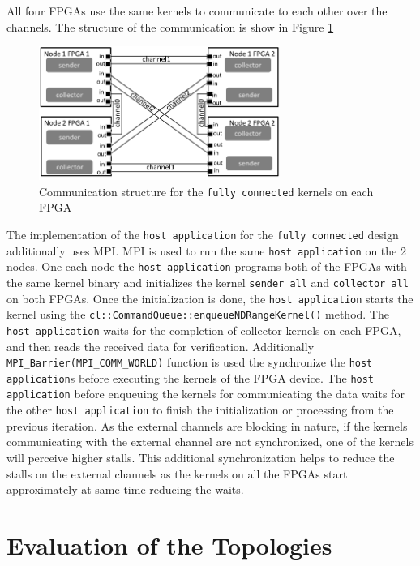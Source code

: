All four FPGAs use the same kernels to communicate to each other over the channels.
The structure of the communication is show in Figure \ref{fig:fc_struc}

\begin{figure}[h]%
    \centering
    \includegraphics[width=0.7\textwidth]{images/fc_struc}
    \caption{Communication structure for the \texttt{fully connected} kernels on each FPGA}
    \label{fig:fc_struc}
\end{figure}

The implementation of the \texttt{host application} for the \texttt{fully connected} design additionally
uses MPI. MPI is used to run the same \texttt{host application} on the 2 nodes. One each node
the \texttt{host application} programs both of the FPGAs with the same kernel binary and initializes
the kernel \texttt{sender\_all} and \texttt{collector\_all} on both FPGAs. Once the initialization
is done, the \texttt{host application} starts the kernel using the \texttt{cl::CommandQueue::enqueueNDRangeKernel()}
method. The \texttt{host application} waits for the completion of collector kernels on each FPGA, and then reads
the received data for verification. Additionally \texttt{MPI\_Barrier(MPI\_COMM\_WORLD)} function
is used the synchronize the \texttt{host application}s before executing the kernels of the FPGA device.
The \texttt{host application} before enqueuing the kernels for communicating the data waits
for the other \texttt{host application} to finish the initialization or processing from the previous
iteration. As the external channels are blocking in nature, if the kernels communicating
with the external channel are not synchronized, one of the kernels will perceive higher stalls.
This additional synchronization helps to reduce the stalls on the external channels
as the kernels on all the FPGAs start approximately at same time reducing the waits.


\section{Evaluation of the Topologies}
\label{sec:top_eval}

